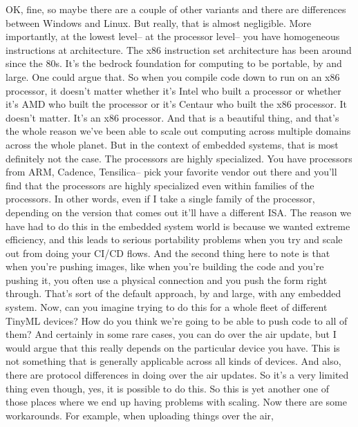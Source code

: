 {{{    OK, fine, so maybe there are a couple of other variants
    and there are differences between Windows and Linux.
    But really, that is almost negligible.
    More importantly, at the lowest level-- at the processor level--
    you have homogeneous instructions at architecture.
    The x86 instruction set architecture has been around since the 80s.
    It's the bedrock foundation for computing to be portable, by and large.
    One could argue that.
    So when you compile code down to run on an x86 processor,
    it doesn't matter whether it's Intel who built a processor
    or whether it's AMD who built the processor
    or it's Centaur who built the x86 processor.
    It doesn't matter.
    It's an x86 processor.
    And that is a beautiful thing, and that's
    the whole reason we've been able to scale out
    computing across multiple domains across the whole planet.
    But in the context of embedded systems, that is most definitely not the case.
    The processors are highly specialized.
    You have processors from ARM, Cadence, Tensilica-- pick your favorite vendor
    out there and you'll find that the processors are highly specialized even
    within families of the processors.
    In other words, even if I take a single family of the processor,
    depending on the version that comes out it'll have a different ISA.
    The reason we have had to do this in the embedded system world
    is because we wanted extreme efficiency, and this
    leads to serious portability problems when you try and scale out
    from doing your CI/CD flows.
    And the second thing here to note is that when you're pushing images,
    like when you're building the code and you're pushing it,
    you often use a physical connection and you push the form right through.
    That's sort of the default approach, by and large, with any embedded system.
    Now, can you imagine trying to do this for a whole fleet of different TinyML
    devices?
    How do you think we're going to be able to push code to all of them?
    And certainly in some rare cases, you can do over the air update,
    but I would argue that this really depends
    on the particular device you have.
    This is not something that is generally applicable across all kinds of devices.
    And also, there are protocol differences in doing over the air updates.
    So it's a very limited thing even though, yes, it is possible to do this.
    So this is yet another one of those places
    where we end up having problems with scaling.
    Now there are some workarounds.
    For example, when uploading things over the air,
}}}
